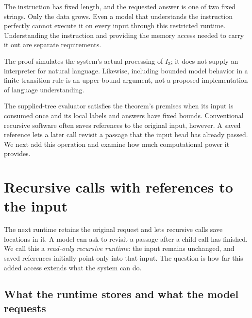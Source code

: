 \documentclass[11pt,twoside]{article}
\theoremstyle{definition}
\theoremstyle{remark}
\begin{document}
The instruction has fixed length, and the requested answer is one of two
fixed strings. Only the data grows. Even a model that understands the
instruction perfectly cannot execute it on every input through this
restricted runtime. Understanding the instruction and providing the memory
access needed to carry it out are separate requirements.

The proof simulates the system's actual processing of $I_3$; it does not
supply an interpreter for natural language. Likewise, including bounded
model behavior in a finite transition rule is an upper-bound argument,
not a proposed implementation of language understanding.

The supplied-tree evaluator satisfies the theorem's premises when its input
is consumed once and its local labels and answers have fixed bounds.
Conventional recursive software often saves references to the original
input, however. A saved reference lets a later call revisit a passage that
the input head has already passed. We next add this operation and examine
how much computational power it provides.

\section{Recursive calls with references to the input}
\label{sec:readonly}

The next runtime retains the original request and lets recursive calls
save locations in it. A model can ask to revisit a passage after a child
call has finished. We call this a \emph{read-only recursive runtime}:
the input remains unchanged, and saved references initially point only
into that input. The question is how far this added access extends what
the system can do.

\subsection{What the runtime stores and what the model requests}
\end{document}
